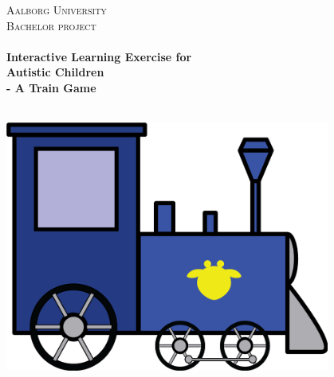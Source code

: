 \begin{titlingpage}\centering



\textsc{\LARGE Aalborg University}\\[0.3cm]

\textsc{\Large Bachelor project}\\[0.3cm]

\HRule \\[0.4cm]
{\huge \bfseries Interactive Learning Exercise for\\Autistic Children}\\[0.5cm]
{\Large \bfseries - A Train Game}

\HRule \\[2cm]

\includegraphics[width=0.8\textwidth]{img/train}

\end{titlingpage}
